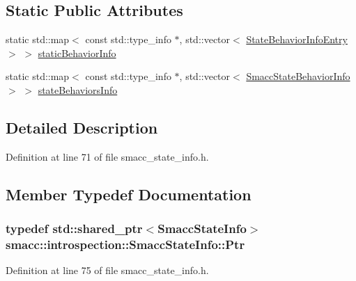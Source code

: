 \subsection*{Static Public Attributes}
\begin{DoxyCompactItemize}
\item 
static std\+::map$<$ const std\+::type\+\_\+info $\ast$, std\+::vector$<$ \hyperlink{structsmacc_1_1introspection_1_1StateBehaviorInfoEntry}{State\+Behavior\+Info\+Entry} $>$ $>$ \hyperlink{classsmacc_1_1introspection_1_1SmaccStateInfo_a2cc62c6c9dec1a4f5294f8430efb71f2}{static\+Behavior\+Info}
\item 
static std\+::map$<$ const std\+::type\+\_\+info $\ast$, std\+::vector$<$ \hyperlink{structsmacc_1_1introspection_1_1SmaccStateBehaviorInfo}{Smacc\+State\+Behavior\+Info} $>$ $>$ \hyperlink{classsmacc_1_1introspection_1_1SmaccStateInfo_a7f62357b9ed1db5b8f9fcc3394f7f58b}{state\+Behaviors\+Info}
\end{DoxyCompactItemize}


\subsection{Detailed Description}


Definition at line 71 of file smacc\+\_\+state\+\_\+info.\+h.



\subsection{Member Typedef Documentation}
\subsubsection[{\texorpdfstring{Ptr}{Ptr}}]{\setlength{\rightskip}{0pt plus 5cm}typedef std\+::shared\+\_\+ptr$<${\bf Smacc\+State\+Info}$>$ {\bf smacc\+::introspection\+::\+Smacc\+State\+Info\+::\+Ptr}}\hypertarget{classsmacc_1_1introspection_1_1SmaccStateInfo_a374ef2022bca958ab14469931fc4dcc1}{}\label{classsmacc_1_1introspection_1_1SmaccStateInfo_a374ef2022bca958ab14469931fc4dcc1}


Definition at line 75 of file smacc\+\_\+state\+\_\+info.\+h.



